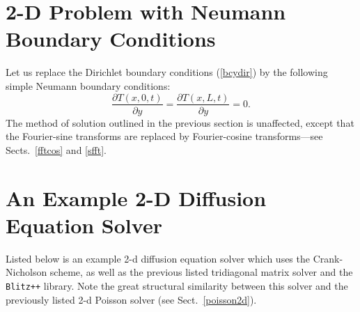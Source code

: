 \section{2-D Problem with Neumann Boundary Conditions}
Let us replace the Dirichlet  boundary conditions (\ref{bcydir}) by the following
simple Neumann boundary conditions:
\begin{equation}
\frac{\partial T(x,0,t)}{\partial y} = \frac{\partial T(x,L,t)}{\partial y} = 0.
\end{equation}
The  method of solution outlined in the previous section is unaffected, 
except that the Fourier-sine transforms
are replaced by Fourier-cosine transforms---see Sects.~\ref{fftcos} and \ref{sfft}.

\section{An Example 2-D Diffusion Equation Solver}
Listed below is an example 2-d diffusion equation solver which uses the Crank-Nicholson
scheme, as well as the previous listed tridiagonal matrix solver and the {\tt Blitz++}
library. Note the great structural similarity between this solver and the previously listed
2-d Poisson solver (see Sect.~\ref{poisson2d}).
